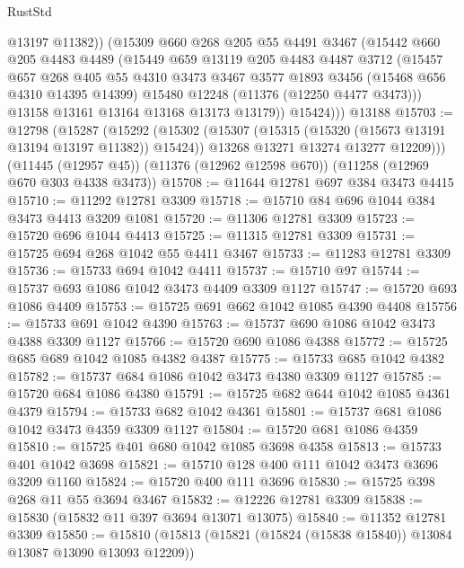 \begin{lexlean}{RustStd}
\begin{coremodule}
{\begin{coremodule}
{{{{{{{{{{{{{{{{{{{{{{{{{{{{{{{{{{{{{{{{{{{{{{{{{{{{{{{{{{{{{{{{{{{{{{{{{{{{{{{{{{{{{            @13197
            @11382))
        (@15309
          @660
          @268
          @205
          @55
          @4491
          @3467
          (@15442
            @660
            @205
            @4483
            @4489
            (@15449
              @659
              @13119
              @205
              @4483
              @4487
              @3712
              (@15457
                @657
                @268
                @405
                @55
                @4310
                @3473
                @3467
                @3577
                @1893
                @3456
                (@15468 @656 @4310 @14395 @14399)
                @15480
                @12248
                (@11376 (@12250 @4477 @3473)))
              @13158
              @13161
              @13164
              @13168
              @13173
              @13179))
          @15424)))
    @13188
@15703 := @12798
    (@15287
      (@15292
        (@15302
          (@15307 (@15315 (@15320 (@15673 @13191 @13194 @13197 @11382)) @15424))
          @13268
          @13271
          @13274
          @13277
          @12209)))
    (@11445 (@12957 @45))
    (@11376 (@12962 @12598 @670))
    (@11258 (@12969 @670 @303 @4338 @3473))
@15708 := @11644 @12781 @697 @384 @3473 @4415
@15710 := @11292 @12781 @3309
@15718 := @15710 @84 @696 @1044 @384 @3473 @4413 @3209 @1081
@15720 := @11306 @12781 @3309
@15723 := @15720 @696 @1044 @4413
@15725 := @11315 @12781 @3309
@15731 := @15725 @694 @268 @1042 @55 @4411 @3467
@15733 := @11283 @12781 @3309
@15736 := @15733 @694 @1042 @4411
@15737 := @15710 @97
@15744 := @15737 @693 @1086 @1042 @3473 @4409 @3309 @1127
@15747 := @15720 @693 @1086 @4409
@15753 := @15725 @691 @662 @1042 @1085 @4390 @4408
@15756 := @15733 @691 @1042 @4390
@15763 := @15737 @690 @1086 @1042 @3473 @4388 @3309 @1127
@15766 := @15720 @690 @1086 @4388
@15772 := @15725 @685 @689 @1042 @1085 @4382 @4387
@15775 := @15733 @685 @1042 @4382
@15782 := @15737 @684 @1086 @1042 @3473 @4380 @3309 @1127
@15785 := @15720 @684 @1086 @4380
@15791 := @15725 @682 @644 @1042 @1085 @4361 @4379
@15794 := @15733 @682 @1042 @4361
@15801 := @15737 @681 @1086 @1042 @3473 @4359 @3309 @1127
@15804 := @15720 @681 @1086 @4359
@15810 := @15725 @401 @680 @1042 @1085 @3698 @4358
@15813 := @15733 @401 @1042 @3698
@15821 := @15710 @128 @400 @111 @1042 @3473 @3696 @3209 @1160
@15824 := @15720 @400 @111 @3696
@15830 := @15725 @398 @268 @11 @55 @3694 @3467
@15832 := @12226 @12781 @3309
@15838 := @15830 (@15832 @11 @397 @3694 @13071 @13075)
@15840 := @11352 @12781 @3309
@15850 := @15810 (@15813 (@15821 (@15824 (@15838 @15840)) @13084 @13087 @13090 @13093 @12209))
}}}}}}}}}}}}}}}}}}}}}}}}}}}}}}}}}}}}}}}}}}}}}}}}}}}}}}}}}}}}}}}}}}}}}}}}}}}}}}}}}}}}}
\end{coremodule}}
\end{coremodule}
\end{lexlean}
